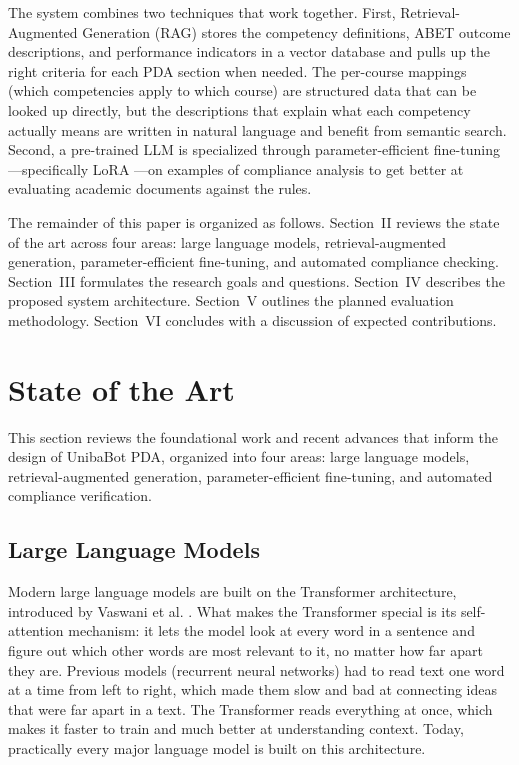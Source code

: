 \documentclass[conference]{IEEEtran}
\begin{document}
The system combines two techniques that work together. First, Retrieval-Augmented Generation (RAG) \cite{lewis2020rag} stores the competency definitions, ABET outcome descriptions, and performance indicators in a vector database and pulls up the right criteria for each PDA section when needed. The per-course mappings (which competencies apply to which course) are structured data that can be looked up directly, but the descriptions that explain what each competency actually means are written in natural language and benefit from semantic search. Second, a pre-trained LLM is specialized through parameter-efficient fine-tuning---specifically LoRA \cite{hu2022lora}---on examples of compliance analysis to get better at evaluating academic documents against the rules.

The remainder of this paper is organized as follows. Section~II reviews the state of the art across four areas: large language models, retrieval-augmented generation, parameter-efficient fine-tuning, and automated compliance checking. Section~III formulates the research goals and questions. Section~IV describes the proposed system architecture. Section~V outlines the planned evaluation methodology. Section~VI concludes with a discussion of expected contributions.

\section{State of the Art}

This section reviews the foundational work and recent advances that inform the design of UnibaBot PDA, organized into four areas: large language models, retrieval-augmented generation, parameter-efficient fine-tuning, and automated compliance verification.

\subsection{Large Language Models}

Modern large language models are built on the Transformer architecture, introduced by Vaswani et al. \cite{vaswani2017attention}. What makes the Transformer special is its self-attention mechanism: it lets the model look at every word in a sentence and figure out which other words are most relevant to it, no matter how far apart they are. Previous models (recurrent neural networks) had to read text one word at a time from left to right, which made them slow and bad at connecting ideas that were far apart in a text. The Transformer reads everything at once, which makes it faster to train and much better at understanding context. Today, practically every major language model is built on this architecture.
\end{document}
